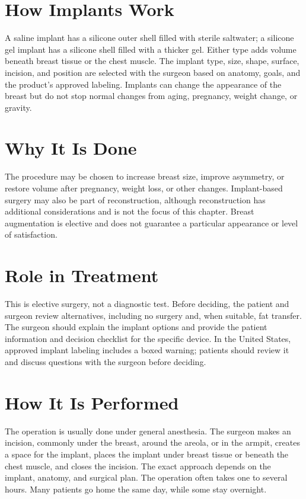 \section*{How Implants Work}
A saline implant has a silicone outer shell filled with sterile saltwater; a silicone gel implant has a silicone shell filled with a thicker gel. Either type adds volume beneath breast tissue or the chest muscle. The implant type, size, shape, surface, incision, and position are selected with the surgeon based on anatomy, goals, and the product's approved labeling. Implants can change the appearance of the breast but do not stop normal changes from aging, pregnancy, weight change, or gravity.

\section*{Why It Is Done}
The procedure may be chosen to increase breast size, improve asymmetry, or restore volume after pregnancy, weight loss, or other changes. Implant-based surgery may also be part of reconstruction, although reconstruction has additional considerations and is not the focus of this chapter. Breast augmentation is elective and does not guarantee a particular appearance or level of satisfaction.

\section*{Role in Treatment}
This is elective surgery, not a diagnostic test. Before deciding, the patient and surgeon review alternatives, including no surgery and, when suitable, fat transfer. The surgeon should explain the implant options and provide the patient information and decision checklist for the specific device. In the United States, approved implant labeling includes a boxed warning; patients should review it and discuss questions with the surgeon before deciding.

\section*{How It Is Performed}
The operation is usually done under general anesthesia. The surgeon makes an incision, commonly under the breast, around the areola, or in the armpit, creates a space for the implant, places the implant under breast tissue or beneath the chest muscle, and closes the incision. The exact approach depends on the implant, anatomy, and surgical plan. The operation often takes one to several hours. Many patients go home the same day, while some stay overnight.

